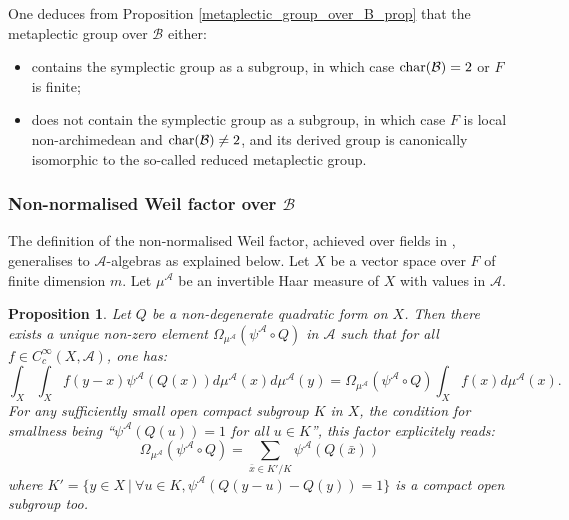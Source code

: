 \documentclass[11pt]{article}
\theoremstyle{plain}
\newtheorem{prop}[theo]{Proposition}
\theoremstyle{definition}
\theoremstyle{plain}
\theoremstyle{definition}
\theoremstyle{plain}
\begin{document}
One deduces from Proposition \ref{metaplectic_group_over_B_prop} that the metaplectic group over $\mathcal{B}$ either:
\begin{itemize}
\item contains the symplectic group as a subgroup, in which case $\textup{char}(\mathcal{B})=2$ or $F$ is finite;
\item does not contain the symplectic group as a subgroup, in which case $F$ is local non-archimedean and $\textup{char}(\mathcal{B}) \neq 2$, and its derived group is canonically isomorphic to the so-called reduced metaplectic group.
\end{itemize}

\subsubsection{Non-normalised Weil factor over $\mathcal{B}$}

The definition of the non-normalised Weil factor, achieved over fields in \cite[Sec. 1.1]{trias_theta1}, generalises to $\mathcal{A}$-algebras as explained below. Let $X$ be a vector space over $F$ of finite dimension $m$. Let $\mu^\mathcal{A}$ be an invertible Haar measure of $X$ with values in $\mathcal{A}$.

\begin{prop} Let $Q$ be a non-degenerate quadratic form on $X$. Then there exists a unique non-zero element $\Omega_{\mu^\mathcal{A}}(\psi^\mathcal{A} \circ Q)$ in $\mathcal{A}$ such that for all $f \in C_c^\infty(X,\mathcal{A})$, one has:
$$\int_X \int_X f(y-x) \psi^\mathcal{A}( Q(x)) d\mu^\mathcal{A} (x) d\mu^\mathcal{A} (y) = \Omega_{\mu^\mathcal{A}}(\psi^\mathcal{A} \circ Q) \int_X f(x) d \mu^\mathcal{A} (x).$$
For any sufficiently small open compact subgroup $K$ in $X$, the condition for smallness being ``$\psi^\mathcal{A} (Q(u))=1$ for all $u \in K$'', this factor explicitely reads:
$$\Omega_{\mu^\mathcal{A}}(\psi^\mathcal{A} \circ Q) = \sum_{\bar{x} \in K' / K} \psi^\mathcal{A}(Q(\bar{x}))$$
where $K' = \{ y \in X \ | \ \forall u \in K, \psi^\mathcal{A}(Q(y-u) -Q(y)) = 1 \}$ is a compact open subgroup too. \end{prop}
\end{document}
